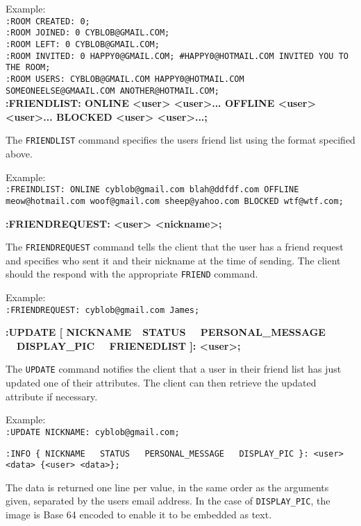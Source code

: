 Example: \\
\texttt{:ROOM CREATED: 0;} \\
\texttt{:ROOM JOINED: 0 CYBLOB@GMAIL.COM;} \\
\texttt{:ROOM LEFT: 0 CYBLOB@GMAIL.COM;} \\
\texttt{:ROOM INVITED: 0 HAPPY0@GMAIL.COM; \#HAPPY0@HOTMAIL.COM INVITED YOU TO THE ROOM;} \\
\texttt{:ROOM USERS: CYBLOB@GMAIL.COM HAPPY0@HOTMAIL.COM \\SOMEONEELSE@GMAAIL.COM ANOTHER@HOTMAIL.COM;} \\

{\bf :FRIENDLIST: ONLINE <user> <user>... OFFLINE <user> <user>... BLOCKED <user> <user>...;}

The \texttt{FRIENDLIST} command specifies the users friend list using the format specified above.

Example: \\
\texttt{:FREINDLIST: ONLINE cyblob@gmail.com blah@ddfdf.com OFFLINE meow@hotmail.com woof@gmail.com sheep@yahoo.com BLOCKED wtf@wtf.com;}

{\bf :FRIENDREQUEST: <user> <nickname>;}

The \texttt{FRIENDREQUEST} command tells the client that the user has a friend request and specifies who sent it and their nickname at the time of sending. The client should the respond with the appropriate \texttt{FRIEND} command.

Example: \\
\texttt{:FRIENDREQUEST: cyblob@gmail.com James;}

{\bf :UPDATE [ NICKNAME\ \vline \ STATUS \ \vline \ PERSONAL\_MESSAGE \ \vline \ DISPLAY\_PIC \ \vline \ FRIENEDLIST  ]: <user>;}

The \texttt{UPDATE} command notifies the client that a user in their friend list has just updated one of their attributes. The client can then retrieve the updated attribute if necessary.

Example: \\
\texttt{:UPDATE NICKNAME: cyblob@gmail.com;}

\texttt{:INFO \{ NICKNAME \ \vline \ STATUS \ \vline \ PERSONAL\_MESSAGE \ \vline \ DISPLAY\_PIC \}: <user> <data> \{<user> <data>\};} 

The data is returned one line per value, in the same order as the arguments given, separated by the users email address. In the case of \texttt{DISPLAY\_PIC}, the image is Base 64 encoded to enable it to be embedded as text.


